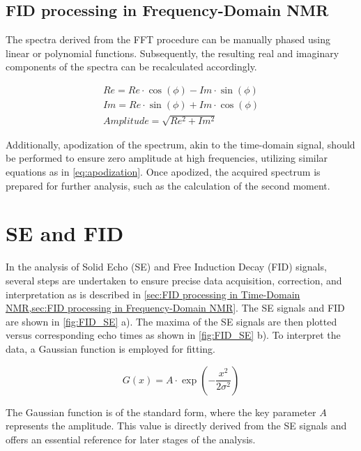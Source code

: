 \documentclass[a4paper,12pt]{article}
\begin{document}
\subsection{FID processing in Frequency-Domain NMR}\label{sec:FID processing in Frequency-Domain NMR}

The spectra derived from the FFT procedure can be manually phased using linear or polynomial functions.
Subsequently, the resulting real and imaginary components of the spectra can be recalculated accordingly. 

\begin{equation}
  \label{eq:amplitude calculation}
  \begin{split}
Re = Re \cdot \cos(\phi) - Im \cdot \sin(\phi)\\
Im = Re \cdot \sin(\phi) + Im \cdot \cos(\phi)\\
Amplitude = \sqrt{Re^2 + Im^2}
  \end{split}
\end{equation}

Additionally, apodization of the spectrum, akin to the time-domain signal, should be performed to ensure zero amplitude at high frequencies, utilizing similar equations as in \cref{eq:apodization}. 
Once apodized, the acquired spectrum is prepared for further analysis, such as the calculation of the second moment.

\section{SE and FID}\label{sec:SE and FID}

In the analysis of Solid Echo (SE) and Free Induction Decay (FID) signals, several steps are undertaken to ensure precise data acquisition, correction, and interpretation as is described in \cref{sec:FID processing in Time-Domain NMR,sec:FID processing in Frequency-Domain NMR}.
The SE signals and FID are shown in \cref{fig:FID_SE} a).
The maxima of the SE signals are then plotted versus corresponding echo times as shown in \cref{fig:FID_SE} b).
To interpret the data, a Gaussian function is employed for fitting. 

\begin{equation}
  \label{eq:gaussian}
  G(x) = A \cdot \exp\left(-\frac{x^2}{2\sigma^2}\right)
\end{equation}

The Gaussian function is of the standard form, where the key parameter $A$ represents the amplitude. 
This value is directly derived from the SE signals and offers an essential reference for later stages of the analysis.
\end{document}
